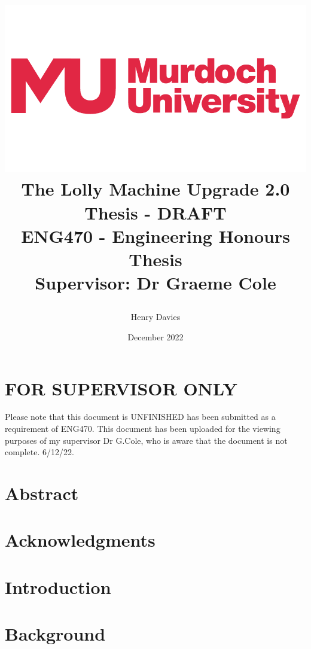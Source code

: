 \documentclass{book}
\title  {\begin{center}
            \includegraphics[scale = 0.2]{murdochLogo} 
            \vspace{10mm}
            \\{\Huge The Lolly Machine Upgrade 2.0}
            \vspace{10mm}
            \\{\Huge Thesis - DRAFT}
            \vspace{5mm}
            \\{\Large ENG470 - Engineering Honours Thesis}
            \vspace{40mm} 
            \\ Supervisor: Dr Graeme Cole
        \end{center}}
\author{Henry Davies}
\date{December 2022}
\begin{document}
\frontmatter

\maketitle
\newpage

\chapter*{FOR SUPERVISOR ONLY}
Please note that this document is UNFINISHED has been submitted as a requirement of ENG470. This document has been uploaded for the viewing purposes of my supervisor Dr G.Cole, who is aware that the document is not complete. 6/12/22.
\newpage

\chapter*{Abstract}


\chapter*{Acknowledgments}


\cite{nodeRedEx}

\tableofcontents
{}
\newpage

\listoffigures
{}
\newpage

\printglossary[type=\acronymtype]
\newpage

\mainmatter
\pagestyle{plain}

\chapter{Introduction}
    \label{chap:intro}
    
    \newpage

\chapter{Background}
    \label{chap:background}
    
    \newpage
\end{document}
